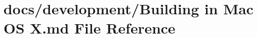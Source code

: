 \hypertarget{Building_01in_01Mac_01OS_01X_8md}{\section{docs/development/\+Building in Mac O\+S X.\+md File Reference}
\label{Building_01in_01Mac_01OS_01X_8md}
}
